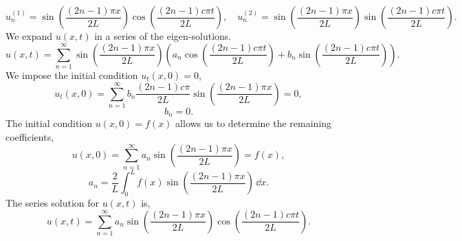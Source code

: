 {\begin{Solution}
\[  \]
  \[
  u_n^{(1)} = \sin \left( \frac{ (2n-1) \pi x }{ 2 L } \right)
  \cos \left( \frac{ (2n-1) c \pi t }{ 2 L } \right), \quad
  u_n^{(2)} = \sin \left( \frac{ (2n-1) \pi x }{ 2 L } \right)
  \sin \left( \frac{ (2n-1) c \pi t }{ 2 L } \right).
  \]
  We expand $u(x,t)$ in a series of the eigen-solutions.
  \[
  u(x,t) = \sum_{n=1}^\infty \sin \left( \frac{ (2n-1) \pi x }{ 2 L } \right)
  \left( a_n \cos \left( \frac{ (2n-1) c \pi t }{ 2 L } \right)
    + b_n \sin \left( \frac{ (2n-1) c \pi t }{ 2 L } \right) \right).
  \]
  We impose the initial condition $u_t(x,0) = 0$,
  \[
  u_t(x,0) = \sum_{n=1}^\infty b_n \frac{ (2n-1) c \pi }{ 2 L } 
  \sin \left( \frac{ (2n-1) \pi x }{ 2 L } \right) = 0,
  \]
  \[
  b_n = 0.
  \]
  The initial condition $u(x,0) = f(x)$ allows us to determine the remaining
  coefficients,
  \[
  u(x,0) = \sum_{n=1}^\infty a_n \sin \left( \frac{ (2n-1) \pi x }{ 2 L } \right) = f(x),
  \]
  \[
  \boxed{
    a_n = \frac{2}{L} \int_0^L f(x) 
    \sin \left( \frac{ (2n-1) \pi x }{ 2 L } \right)\,\dd x.
    }
  \]
  The series solution for $u(x,t)$ is, 
  \[
  \boxed{
    u(x,t) = \sum_{n=1}^\infty a_n \sin \left( \frac{ (2n-1) \pi x }{ 2 L } \right)
    \cos \left( \frac{ (2n-1) c \pi t }{ 2 L } \right).
    }
  \]
\end{Solution}




}
